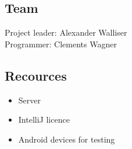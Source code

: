 \documentclass[12pt]{article}
\theoremstyle{definition}
\begin{document}
\subsection{Team}
Project leader: Alexander Walliser \\
Programmer: Clements Wagner

\subsection{Recources}
\begin{itemize}
\item Server
\item IntelliJ licence
\item Android devices for testing
\end{itemize}
\end{document}
